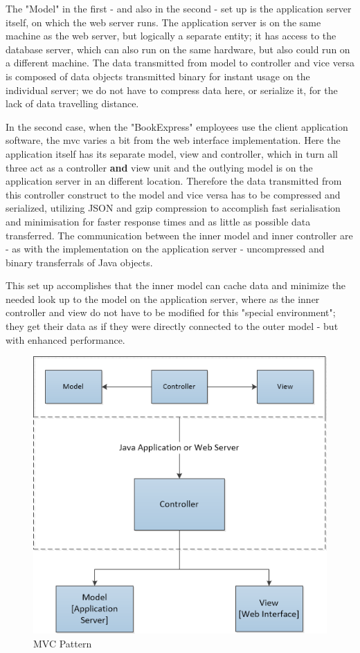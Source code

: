 \documentclass[11pt,a4paper,oneside,svgnames]{report}
\begin{document}
The "Model" in the first - and also in the second - set up is the application server itself, on which the web server runs. The application server is on the same machine as the web server, but logically a separate entity; it has access to the database server, which can also run on the same hardware, but also could run on a different machine. The data transmitted from model to controller and vice versa is composed of data objects transmitted binary for instant usage on the individual server; we do not have to compress data here, or serialize it, for the lack of data travelling distance.

In the second case, when the "BookExpress" employees use the client application software, the \gls{mvc} varies a bit from the web interface implementation. Here the application itself has its separate model, view and controller, which in turn all three act as a controller \textbf{and} view unit and the outlying model is on the application server in an different location. Therefore the data transmitted from this controller construct to the model and vice versa has to be compressed and serialized, utilizing JSON and gzip compression to accomplish fast serialisation and minimisation for faster response times and as little as possible data transferred. The communication between the inner model and inner controller are - as with the implementation on the application server - uncompressed and binary transferrals of Java objects.

This set up accomplishes that the inner model can cache data and minimize the needed look up to the model on the application server, where as the inner controller and view do not have to be modified for this "special environment"; they get their data as if they were directly connected to the outer model - but with enhanced performance.

\begin{figure}[H]
 \begin{center}
  \includegraphics[width=\textwidth]{MVC-small.png}
 \end{center}
 \caption{MVC Pattern}
\end{figure}
\end{document}
